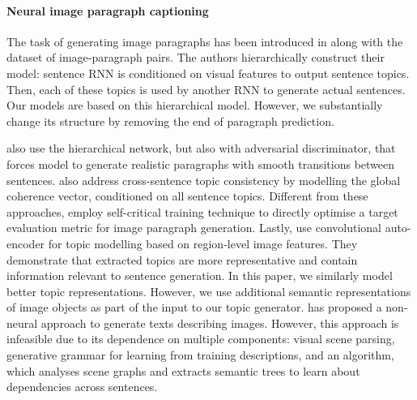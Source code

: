 \documentclass[11pt,a4paper]{article}
\begin{document}


\paragraph{Neural image paragraph captioning}
The task of generating image paragraphs has been introduced in  along with the dataset of image-paragraph pairs.
The authors hierarchically construct their model: sentence RNN is conditioned on visual features to output sentence topics.
Then, each of these topics is used by another RNN to generate actual sentences.
Our models are based on this hierarchical model.
However, we substantially change its structure by removing the end of paragraph prediction.


 also use the hierarchical network, but also with adversarial discriminator, that forces model to generate realistic paragraphs with smooth transitions between sentences.
 also address cross-sentence topic consistency by modelling the global coherence vector, conditioned on all sentence topics.
Different from these approaches,  employ self-critical training technique \cite{selfcritical2016} to directly optimise a target evaluation metric for image paragraph generation.
Lastly,  use convolutional auto-encoder for topic modelling based on region-level image features.
They demonstrate that extracted topics are more representative and contain information relevant to sentence generation.
In this paper, we similarly model better topic representations.
However, we use additional semantic representations of image objects as part of the input to our topic generator.
 has proposed a non-neural approach to generate texts describing images.
However, this approach is infeasible due to its dependence on multiple components: visual scene parsing, generative grammar for learning from training descriptions, and an algorithm, which analyses scene graphs and extracts semantic trees to learn about dependencies across sentences.
\end{document}
